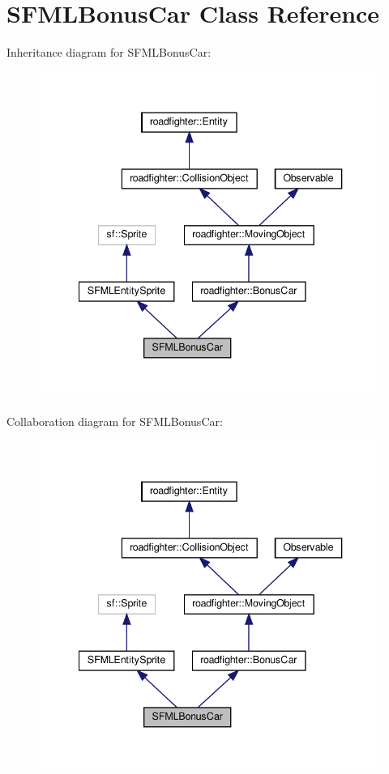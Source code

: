 \hypertarget{classSFMLBonusCar}{}\section{S\+F\+M\+L\+Bonus\+Car Class Reference}
\label{classSFMLBonusCar}


Inheritance diagram for S\+F\+M\+L\+Bonus\+Car\+:\nopagebreak
\begin{figure}[H]
\begin{center}
\leavevmode
\includegraphics[width=340pt]{classSFMLBonusCar__inherit__graph}
\end{center}
\end{figure}


Collaboration diagram for S\+F\+M\+L\+Bonus\+Car\+:\nopagebreak
\begin{figure}[H]
\begin{center}
\leavevmode
\includegraphics[width=340pt]{classSFMLBonusCar__coll__graph}
\end{center}
\end{figure}
